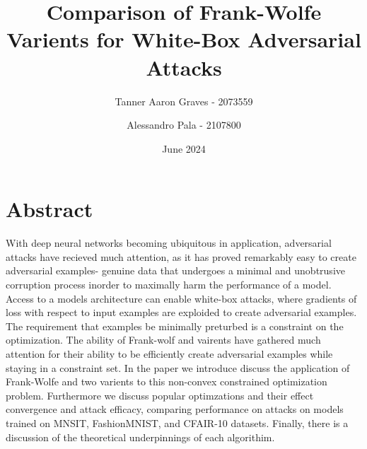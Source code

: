 \documentclass{article}
\title{Comparison of Frank-Wolfe Varients for White-Box Adversarial Attacks}
\author{Tanner Aaron Graves - 2073559\and Alessandro Pala - 2107800}
\date{June 2024}
\begin{document}
\maketitle

\section{Abstract}
With deep neural networks becoming ubiquitous in application, adversarial attacks have recieved much attention, as it has proved remarkably easy to create adversarial examples- genuine data that undergoes a minimal and unobtrusive corruption process inorder to maximally harm the performance of a model. Access to a models architecture can enable white-box attacks, where gradients of loss with respect to input examples are exploided to create adversarial examples. The requirement that examples be minimally preturbed is a constraint on the optimization. The ability of Frank-wolf and vairents have gathered much attention for their ability to be efficiently create adversarial examples while staying in a constraint set. In the paper we introduce discuss the application of Frank-Wolfe and two varients to this non-convex constrained optimization problem. Furthermore we discuss popular optimzations and their effect convergence and attack efficacy, comparing performance on attacks on models trained on MNSIT, FashionMNIST, and CFAIR-10 datasets. Finally, there is a discussion of the theoretical underpinnings of each algorithim.
\end{document}
